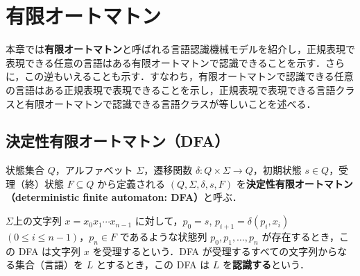 \documentclass[main]{subfiles}
\begin{document}
\setcounter{chapter}{2} %
\setcounter{page}{9} %
\chapter{有限オートマトン}

本章では\textbf{有限オートマトン}と呼ばれる言語認識機械モデルを紹介し，正規表現で表現できる任意の言語はある有限オートマトンで認識できることを示す．さらに，この逆もいえることも示す．すなわち，有限オートマトンで認識できる任意の言語はある正規表現で表現できることを示し，正規表現で表現できる言語クラスと有限オートマトンで認識できる言語クラスが等しいことを述べる．

\section{決定性有限オートマトン（DFA）}

\begin{framed}
\noindent 状態集合 $Q$，アルファベット $\Sigma$，遷移関数 $\delta : Q \times \Sigma \rightarrow Q$，初期状態 $s \in Q$，受理（終）状態 $F \subseteq Q$ から定義される $(Q,\Sigma,\delta,s,F)$ を\textbf{決定性有限オートマトン（deterministic finite automaton: DFA）}と呼ぶ．
\end{framed}

$\Sigma$上の文字列 $x = x_0 x_1 \cdots x_{n-1}$ に対して，$p_0 = s$, $p_{i+1} = \delta(p_i,x_i)$ $(0 \leq i \leq n - 1)$，$p_n \in F$ であるような状態列 $p_0, p_1, \ldots, p_n$ が存在するとき，この DFA は文字列 $x$ を受理するという．DFA が受理するすべての文字列からなる集合（言語）を $L$ とするとき，この DFA は $L$ を\textbf{認識する}という．
\end{document}
